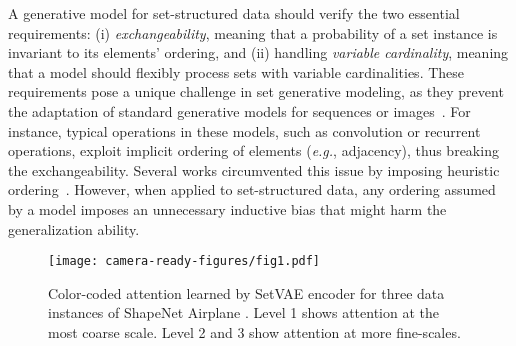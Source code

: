 \documentclass[final]{arxiv/cvpr}
\begin{document}
A generative model for set-structured data should verify the two essential requirements: (i) \textit{exchangeability}, meaning that a probability of a set instance is invariant to its elements' ordering, and (ii) handling \textit{variable cardinality}, meaning that a model should flexibly process sets with variable cardinalities.
These requirements pose a unique challenge in set generative modeling, as they prevent the adaptation of standard generative models for sequences or images~\cite{goodfellow2014generative, karras2019stylebased, oord2016pixel,oord2016conditional}. 
For instance, typical operations in these models, such as convolution or recurrent operations, exploit implicit ordering of elements (\emph{e.g.}, adjacency), thus breaking the exchangeability.
Several works circumvented this issue by imposing heuristic ordering~\cite{hong2018inferring, eslami2016attend, greff2019multi, ritchie2019fast}.
However, when applied to set-structured data, any ordering assumed by a model imposes an unnecessary inductive bias that might harm the generalization ability.

\begin{figure}[t]
    \begin{center}
        \texttt{[image: camera-ready-figures/fig1.pdf]}
    \end{center}
\caption{Color-coded attention learned by SetVAE encoder for three data instances of ShapeNet Airplane \cite{chang2015shapenet}. Level 1 shows attention at the most coarse scale. Level 2 and 3 show attention at more fine-scales.
    }
\label{fig:eyecatcher}
\end{figure}
\end{document}
